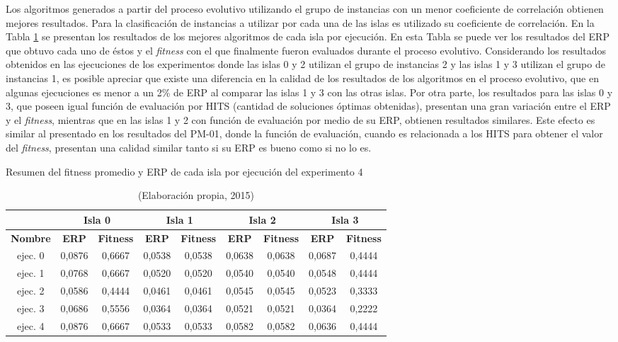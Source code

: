 Los algoritmos generados a partir del proceso evolutivo utilizando el grupo de instancias con un menor coeficiente de correlación obtienen mejores resultados. Para la clasificación de instancias a utilizar por cada una de las islas es utilizado su coeficiente de correlación. En la Tabla \ref{tab:mejores_islas_pvv} se presentan los resultados de los mejores algoritmos de cada isla por ejecución. En esta Tabla se puede ver los resultados del ERP que obtuvo cada uno de éstos y el \textit{fitness} con el que finalmente fueron evaluados durante el proceso evolutivo. Considerando los resultados obtenidos en las ejecuciones de los experimentos donde las islas 0 y 2 utilizan el grupo de instancias 2 y las islas 1 y 3 utilizan el grupo de instancias 1, es posible apreciar que existe una diferencia en la calidad de los resultados de los algoritmos en el proceso evolutivo, que en algunas ejecuciones es menor a un 2\% de ERP al comparar las islas 1 y 3 con las otras islas. Por otra parte, los resultados para las islas 0 y 3, que poseen igual función de evaluación por HITS (cantidad de soluciones óptimas obtenidas), presentan una gran variación entre el ERP y el \textit{fitness}, mientras que en las islas 1 y 2 con función de evaluación por medio de su ERP, obtienen resultados similares. Este efecto es similar al presentado en los resultados del PM-01, donde la función de evaluación, cuando es relacionada a los HITS para obtener el valor del \textit{fitness}, presentan una calidad similar tanto si su ERP es bueno como si no lo es.

\begin{table}[hbtp!]
\caption{Resumen del fitness promedio y ERP de cada isla por ejecución del experimento 4}\label{tab:mejores_islas_pvv}
\small
\centering
\begin{center}
\begin{tabular}{c|cc|cc|cc|cc}
{\textbf{}} & \multicolumn{2}{c|}{{\textbf{Isla 0}}} & \multicolumn{2}{c|}{{\textbf{Isla 1}}} & \multicolumn{2}{c|}{{\textbf{Isla 2}}} & \multicolumn{2}{c}{{\textbf{Isla 3}}}\\ \hline
{\textbf{Nombre}} & {\textbf{ERP}} & {\textbf{Fitness}} & {\textbf{ERP}} & {\textbf{Fitness}} & {\textbf{ERP}} & {\textbf{Fitness}} & {\textbf{ERP}} & {\textbf{Fitness}} \\ \hline
ejec. 0 & 0,0876 & 0,6667 & 0,0538 & 0,0538 & 0,0638 & 0,0638 & 0,0687 & 0,4444 \\
ejec. 1 & 0,0768 & 0,6667 & 0,0520 & 0,0520 & 0,0540 & 0,0540 & 0,0548 & 0,4444 \\
ejec. 2 & 0,0586 & 0,4444 & 0,0461 & 0,0461 & 0,0545 & 0,0545 & 0,0523 & 0,3333 \\
ejec. 3 & 0,0686 & 0,5556 & 0,0364 & 0,0364 & 0,0521 & 0,0521 & 0,0364 & 0,2222 \\
ejec. 4 & 0,0876 & 0,6667 & 0,0533 & 0,0533 & 0,0582 & 0,0582 & 0,0636 & 0,4444 \\
\hline
\end{tabular}
\end{center}
\caption*{(Elaboración propia, 2015)}
\end{table}

